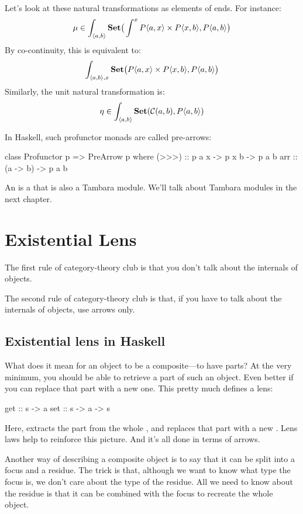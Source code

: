 \documentclass[DaoFP]{subfiles}
\begin{document}
Let's look at these natural transformations as elements of ends. For instance:
\[ \mu \in \int_{\langle a, b \rangle} \mathbf{Set} \big( \int^x P \langle a, x \rangle \times P \langle x, b \rangle,  P\langle a, b \rangle \big) \]
By co-continuity, this is equivalent to:
\[ \int_{\langle a, b \rangle, x} \mathbf{Set} \big(P \langle a, x \rangle \times P \langle x, b \rangle,  P\langle a, b \rangle \big) \]
Similarly, the unit natural transformation is:
\[ \eta \in \int_{\langle a, b \rangle} \mathbf{Set} (\mathcal{C}(a, b), P\langle a, b \rangle) \]

In Haskell, such profunctor monads are called pre-arrows:
\begin{haskell}
class Profunctor p => PreArrow p where
  (>>>) :: p a x -> p x b -> p a b
  arr   :: (a -> b) -> p a b
\end{haskell}
An  is a  that is also a Tambara module. We'll talk about Tambara modules in the next chapter.

\section{Existential Lens}

The first rule of category-theory club is that you don't talk about the internals of objects.

The second rule of category-theory club is that, if you have to talk about the internals of objects, use arrows only.

\subsection{Existential lens in Haskell}

What does it mean for an object to be a composite---to have parts? At the very minimum, you should be able to retrieve a part of such an object. Even better if you can replace that part with a new one. This pretty much defines a lens:
\begin{haskell}
get :: s -> a
set :: s -> a -> s
\end{haskell}
Here,  extracts the part  from the whole , and  replaces that part with a new . Lens laws help to reinforce this picture. And it's all done in terms of arrows. 

Another way of describing a composite object is to say that it can be split into a focus and a residue. The trick is that, although we want to know what type the focus is, we don't care about the type of the residue. All we need to know about the residue is that it can be combined with the focus to recreate the whole object. 
\end{document}
